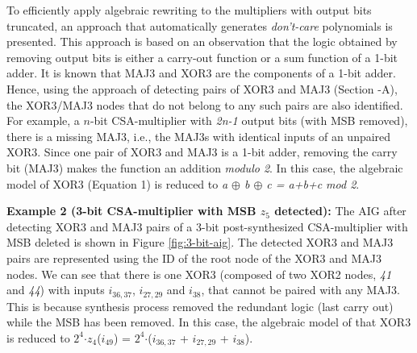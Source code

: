 
To efficiently apply algebraic rewriting to the multipliers with output bits truncated, an approach that automatically generates \textit{don't-care} polynomials is presented. This approach is based on an observation that the logic obtained by removing output bits is either a carry-out function or a sum function of a 1-bit adder. It is known that MAJ3 and XOR3 are the components of a 1-bit adder. Hence, using the approach of detecting pairs of XOR3 and MAJ3 (Section -A), the XOR3/MAJ3 nodes that do not belong to any such pairs are also identified. For example, a $n$-bit CSA-multiplier with \textit{2n-1} output bits (with MSB removed), there is a missing MAJ3, i.e., the MAJ3s with identical inputs of an unpaired XOR3. Since one pair of XOR3 and MAJ3 is a 1-bit adder, removing the carry bit (MAJ3) makes the function an addition \textit{modulo 2}. In this case, the algebraic model of XOR3 (Equation 1) is reduced to \textit{a $\oplus$ b $\oplus$ c = a+b+c mod 2}. %

\textbf{Example 2 (3-bit CSA-multiplier with MSB $z_{5}$ detected):} The AIG after detecting XOR3 and MAJ3 pairs of a 3-bit post-synthesized CSA-multiplier with MSB deleted is shown in Figure \ref{fig:3-bit-aig}. The detected XOR3 and MAJ3 pairs are represented using the ID of the root node of the XOR3 and MAJ3 nodes. We can see that there is one XOR3 (composed of two XOR2 nodes, \textit{41} and \textit{44}) with inputs $i_{36,37}$, $i_{27,29}$ and $i_{38}$, that cannot be paired with any MAJ3. This is because synthesis process removed the redundant logic (last carry out) while the MSB has been removed. In this case, the algebraic model of that XOR3 is reduced to $2^{4}$$\cdot$$z_{4}$($i_{49}$) = $2^4$$\cdot$($i_{36,37}$ + $i_{27,29}$ + $i_{38}$).



